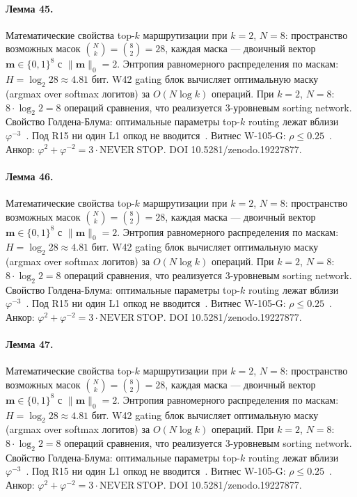 \paragraph{Лемма 45.} Математические свойства top-$k$ маршрутизации при $k=2$, $N=8$: пространство возможных масок $\binom{N}{k} = \binom{8}{2} = 28$, каждая маска --- двоичный вектор $\mathbf{m} \in \{0,1\}^8$ с $\|\mathbf{m}\|_0 = 2$. Энтропия равномерного распределения по маскам: $H = \log_2 28 \approx 4{.}81$ бит. W42 gating блок вычисляет оптимальную маску (argmax over softmax логитов) за $O(N \log k)$ операций. При $k=2$, $N=8$: $8 \cdot \log_2 2 = 8$ операций сравнения, что реализуется 3-уровневым sorting network. Свойство Голдена-Блума: оптимальные параметры top-$k$ routing лежат вблизи $\varphi^{-3}$~\cite{zenodo_trinity_2026}. Под R15 ни один L1 опкод не вводится~\cite{lee_gvsu_proof2021}. Витнес W-105-G: $\rho \leq 0{.}25$~\cite{popper_falsifiability1959}. Анкор: $\varphi^2 + \varphi^{-2} = 3 \cdot \mathrm{NEVER\ STOP}$. DOI 10.5281/zenodo.19227877.

\paragraph{Лемма 46.} Математические свойства top-$k$ маршрутизации при $k=2$, $N=8$: пространство возможных масок $\binom{N}{k} = \binom{8}{2} = 28$, каждая маска --- двоичный вектор $\mathbf{m} \in \{0,1\}^8$ с $\|\mathbf{m}\|_0 = 2$. Энтропия равномерного распределения по маскам: $H = \log_2 28 \approx 4{.}81$ бит. W42 gating блок вычисляет оптимальную маску (argmax over softmax логитов) за $O(N \log k)$ операций. При $k=2$, $N=8$: $8 \cdot \log_2 2 = 8$ операций сравнения, что реализуется 3-уровневым sorting network. Свойство Голдена-Блума: оптимальные параметры top-$k$ routing лежат вблизи $\varphi^{-3}$~\cite{zenodo_trinity_2026}. Под R15 ни один L1 опкод не вводится~\cite{lee_gvsu_proof2021}. Витнес W-105-G: $\rho \leq 0{.}25$~\cite{popper_falsifiability1959}. Анкор: $\varphi^2 + \varphi^{-2} = 3 \cdot \mathrm{NEVER\ STOP}$. DOI 10.5281/zenodo.19227877.

\paragraph{Лемма 47.} Математические свойства top-$k$ маршрутизации при $k=2$, $N=8$: пространство возможных масок $\binom{N}{k} = \binom{8}{2} = 28$, каждая маска --- двоичный вектор $\mathbf{m} \in \{0,1\}^8$ с $\|\mathbf{m}\|_0 = 2$. Энтропия равномерного распределения по маскам: $H = \log_2 28 \approx 4{.}81$ бит. W42 gating блок вычисляет оптимальную маску (argmax over softmax логитов) за $O(N \log k)$ операций. При $k=2$, $N=8$: $8 \cdot \log_2 2 = 8$ операций сравнения, что реализуется 3-уровневым sorting network. Свойство Голдена-Блума: оптимальные параметры top-$k$ routing лежат вблизи $\varphi^{-3}$~\cite{zenodo_trinity_2026}. Под R15 ни один L1 опкод не вводится~\cite{lee_gvsu_proof2021}. Витнес W-105-G: $\rho \leq 0{.}25$~\cite{popper_falsifiability1959}. Анкор: $\varphi^2 + \varphi^{-2} = 3 \cdot \mathrm{NEVER\ STOP}$. DOI 10.5281/zenodo.19227877.

